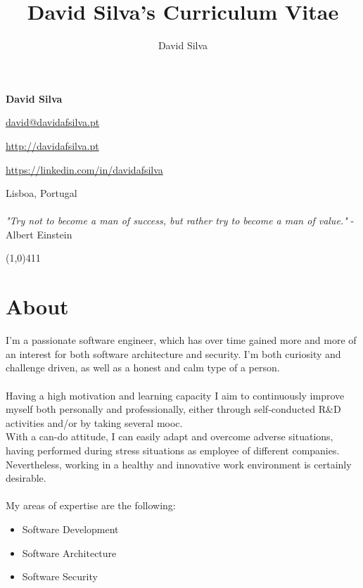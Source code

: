 \documentclass[10pt]{article}
\title{David Silva's Curriculum Vitae}
\author{David Silva}
\newenvironment{listing}{
 \begin{itemize}
  \setlength{\itemsep}{1pt}
  \setlength{\parskip}{0pt}
  \setlength{\parsep}{0pt}
}{\end{itemize}}
\begin{document}
\pagestyle{fancy}

\begin{minipage}[ht]{0.46\textwidth}
	\vspace{-5mm}\Huge{\textbf{David Silva}}
\end{minipage}
\begin{minipage}[ht]{0.46\textwidth}
\hfill \href{mailto:david@davidafsilva.pt}{david@davidafsilva.pt}

\hfill \url{http://davidafsilva.pt}

\hfill \url{https://linkedin.com/in/davidafsilva}
\end{minipage}

\begin{minipage}[ht]{0.925\textwidth}
\vspace{-3mm} Lisboa, Portugal\\\\
\vspace{0 mm} \hfill\footnotesize{
    \textit{"Try not to become a man of success, but rather try to become a man of value."} - Albert Einstein
}
\vspace{0.5mm}
\end{minipage}

\line(1,0){411}

\section*{About}
I'm a passionate software engineer, which has over time gained more and more of an interest for both software architecture and security. I'm both curiosity and challenge driven, as well as a honest and calm type of a person.\\\\
Having a high motivation and learning capacity I aim to continuously improve myself both personally and professionally, either through self-conducted R\&D activities and/or by taking several \gls{mooc}. \\
With a can-do attitude, I can easily adapt and overcome adverse situations, having performed during stress situations as employee of different companies.
Nevertheless, working in a healthy and innovative work environment is certainly desirable.\\\\
My areas of expertise are the following:
\begin{listing}
	\item Software Development
	\item Software Architecture
	\item Software Security
\end{listing}
\end{document}
